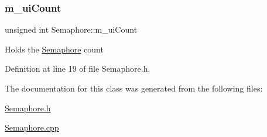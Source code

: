 \subsubsection{\texorpdfstring{m\+\_\+ui\+Count}{m\_uiCount}}
{\footnotesize\ttfamily unsigned int Semaphore\+::m\+\_\+ui\+Count\hspace{0.3cm}{\ttfamily [private]}}

Holds the \hyperlink{classSemaphore}{Semaphore} count 

Definition at line 19 of file Semaphore.\+h.



The documentation for this class was generated from the following files\+:\begin{DoxyCompactItemize}
\item 
\hyperlink{Semaphore_8h}{Semaphore.\+h}\item 
\hyperlink{Semaphore_8cpp}{Semaphore.\+cpp}\end{DoxyCompactItemize}

